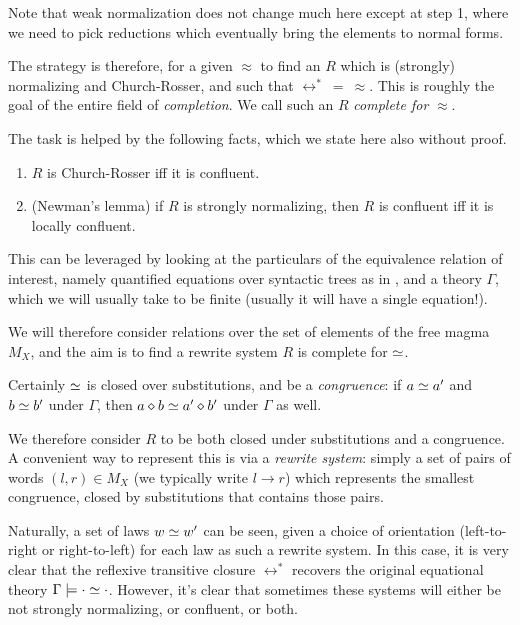Note that weak normalization does not change much here except at step 1, where we need to pick reductions which eventually bring the elements to normal forms.

The strategy is therefore, for a given $\approx$ to find an $R$ which is (strongly) normalizing and Church-Rosser, and such that $\leftrightarrow^*\ =\ \approx$. This is roughly the goal of the entire field of \emph{completion}. We call such an $R$ \emph{complete for} $\approx$.

The task is helped by the following facts, which we state here also without proof.

\begin{theorem}
  \begin{enumerate}
    \item $R$ is Church-Rosser iff it is confluent.
    \item (Newman's lemma) if $R$ is strongly normalizing, then $R$ is confluent iff it is locally confluent.
  \end{enumerate}
\end{theorem}

This can be leveraged by looking at the particulars of the equivalence relation of interest, namely quantified equations over syntactic trees as in , and a theory $\Gamma$, which we will usually take to be finite (usually it will have a single equation!).

We will therefore consider relations over the set of elements of the free magma $M_{X}$, and the aim is to find a rewrite system $R$ is complete for $\simeq$.

Certainly $\simeq$ is closed over substitutions, and be a \emph{congruence}: if $a\simeq a'$ and $b\simeq b'$ under $\Gamma$, then $a\diamond b\simeq a'\diamond b'$ under $\Gamma$ as well.

We therefore consider $R$ to be both closed under substitutions and a congruence. A convenient way to represent this is via a \emph{rewrite system}: simply a set of pairs of words $(l, r) \in M_{X}$ (we typically write $l\rightarrow r$) which represents the smallest congruence, closed by substitutions that contains those pairs.

Naturally, a set of laws $w \simeq w'$ can be seen, given a choice of orientation (left-to-right or right-to-left) for each law as such a rewrite system. In this case, it is very clear that the reflexive transitive closure $\leftrightarrow^*$ recovers the original equational theory $\Gamma\models \cdot\simeq\cdot$. However, it's clear that sometimes these systems will either be not strongly normalizing, or confluent, or both.

